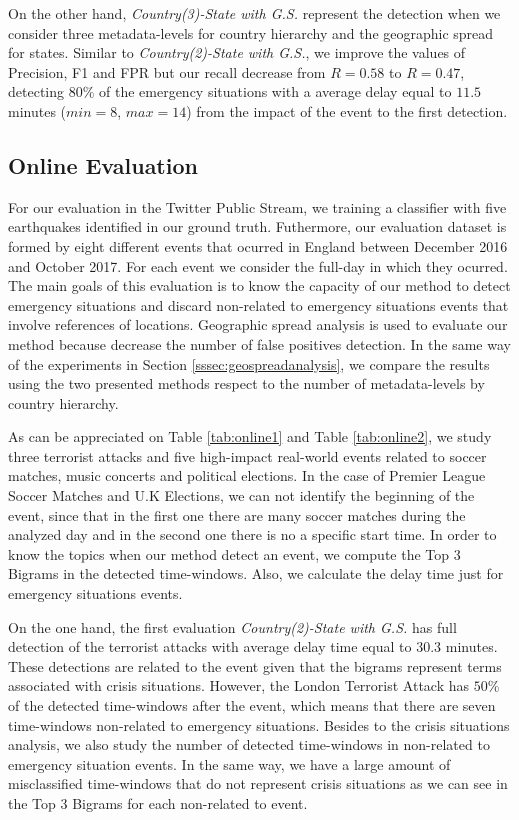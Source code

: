 \documentclass[sigconf]{acmart}
\begin{document}
On the other hand, \textit{Country(3)-State with G.S.} represent the detection when we consider three metadata-levels for country hierarchy and the geographic spread for states. Similar to  \textit{Country(2)-State with G.S.}, we improve the values of Precision, F1 and FPR but our recall decrease from $R = 0.58$ to $R = 0.47$, detecting  $80\%$ of the emergency situations with a average delay equal to $11.5$ minutes ($min=8$, $max=14$) from the impact of the event to the first detection.


\subsection{Online Evaluation}
For our evaluation in the Twitter Public Stream, we training a classifier with five earthquakes identified in our ground truth. Futhermore, our evaluation dataset is formed by eight different events that ocurred in England between December 2016 and October 2017. For each event we consider the full-day in which they ocurred. The main goals of this evaluation is to know the capacity of our method to detect emergency situations and discard non-related to emergency situations events that involve references of locations. Geographic spread analysis is used to evaluate our method because decrease the number of false positives detection. In the same way of the experiments in Section \ref{sssec:geospreadanalysis}, we compare the results using the two presented methods respect to the number of metadata-levels by country hierarchy.

As can be appreciated on Table \ref{tab:online1} and Table \ref{tab:online2}, we study three terrorist attacks and five high-impact real-world events related to soccer matches, music concerts and political elections. In the case of Premier League Soccer Matches and U.K Elections, we can not identify the beginning of the event, since that in the first one there are many soccer matches during the analyzed day and in the second one there is no a specific start time. In order to know the topics when our method detect an event, we compute the Top 3 Bigrams in the detected time-windows. Also, we calculate the delay time just for emergency situations events.

On the one hand, the first evaluation \textit{Country(2)-State with G.S.} has full detection of the terrorist attacks with average delay time equal to $30.3$ minutes. These detections are related to the event given that the bigrams represent terms associated with crisis situations. However, the London Terrorist Attack has $50\%$ of the detected time-windows after the event, which means that there are seven time-windows non-related to emergency situations. Besides to the crisis situations analysis, we also study the number of detected time-windows in non-related to emergency situation events. In the same way, we have a large amount of misclassified time-windows that do not represent crisis situations as we can see in the Top 3 Bigrams for each non-related to event.
\end{document}
